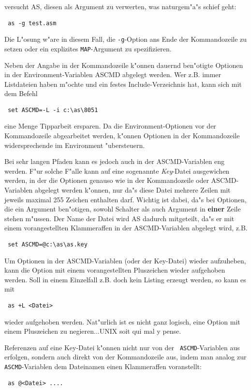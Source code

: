 \documentclass[12pt,a4paper,twoside]{report}
\newcommand{\ii}[1]{{\it #1}}
\newcommand{\bb}[1]{{\bf #1}}
\newcommand{\tty}[1]{{\tt #1}}
\newcommand{\asname}{AS}
\begin{document}
versucht \asname{}, diesen als Argument zu verwerten, was naturgem"a"s schief
geht:
\begin{verbatim}
 as -g test.asm
\end{verbatim}
Die L"osung w"are in diesem Fall, die \tty{-g}-Option ans Ende der
Kommandozeile zu setzen oder ein explizites \tty{MAP}-Argument zu
spezifizieren.
\par
Neben der Angabe in der Kommandozeile k"onnen dauernd ben"otigte
Optionen in der Environment-Variablen ASCMD abgelegt werden. Wer z.B.
immer Listdateien haben m"ochte und ein festes Include-Verzeichnis hat,
kann sich mit dem Befehl
\begin{verbatim}
 set ASCMD=-L -i c:\as\8051
\end{verbatim}
eine Menge Tipparbeit ersparen.  Da die Environment-Optionen vor der
Kommandozeile abgearbeitet werden, k"onnen Optionen in der
Kommandozeile widersprechende im Environment "ubersteuern.
\par
Bei sehr langen Pfaden kann es jedoch auch in der ASCMD-Variablen eng
werden.  F"ur solche F"alle kann auf eine sogenannte \ii{Key}-Datei
ausgewichen werden, in der die Optionen genauso wie in der Kommandozeile
oder ASCMD-Variablen abgelegt werden k"onnen, nur da"s diese Datei
mehrere Zeilen mit jeweils maximal 255 Zeichen enthalten darf.  Wichtig
ist dabei, da"s bei Optionen, die ein Argument ben"otigen, sowohl Schalter
als auch Argument in \bb{einer} Zeile stehen m"ussen.  Der Name der
Datei wird \asname{} dadurch mitgeteilt, da"s er mit einem vorangestellten
Klammeraffen in der ASCMD-Variablen abgelegt wird, z.B.
\begin{verbatim}
 set ASCMD=@c:\as\as.key
\end{verbatim}
Um Optionen in der ASCMD-Variablen (oder der Key-Datei) wieder aufzuheben,
kann die Option mit einem vorangestellten Pluszeichen wieder aufgehoben
werden.  Soll in einem Einzelfall z.B. doch kein Listing erzeugt werden,
so kann es mit
\begin{verbatim}
 as +L <Datei>
\end{verbatim}
wieder aufgehoben werden.  Nat"urlich ist es nicht ganz logisch, eine
Option mit einem Pluszeichen zu negieren...UNIX soit qui mal y pense.
\par
Referenzen auf eine Key-Datei k"onnen nicht nur von der {\tt
ASCMD}-Variablen aus erfolgen, sondern auch direkt von der Kommandozeile
aus, indem man analog zur {\tt ASCMD}-Variablen dem Dateinamen einen
Klammeraffen voranstellt:
\begin{verbatim}
 as @<Datei> ....
\end{verbatim}
\end{document}
